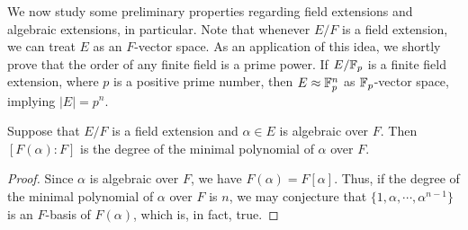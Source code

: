 We now study some preliminary properties regarding field extensions and algebraic extensions, in particular.
Note that whenever $E/F$ is a field extension, we can treat $E$ as an $F$-vector space.
As an application of this idea, we shortly prove that the order of any finite field is a prime power.
If $E/{\mathbb{F}}_p$ is a finite field extension, where $p$ is a positive prime number, then $E\approx {\mathbb{F}}_p^n$ as ${\mathbb{F}}_p$-vector space, implying $|E|=p^n$.

\begin{prop}
    Suppose that $E/F$ is a field extension and $\alpha\in E$ is algebraic over $F$.
    Then $[F(\alpha): F]$ is the degree of the minimal polynomial of $\alpha$ over $F$.
\end{prop}
\begin{proof}
    Since $\alpha$ is algebraic over $F$, we have $F(\alpha)=F[\alpha]$.
    Thus, if the degree of the minimal polynomial of $\alpha$ over $F$ is $n$, we may conjecture that $\{1, \alpha, \cdots, \alpha^{n-1}\}$ is an $F$-basis of $F(\alpha)$, \color{brown}which is, in fact, true\color{black}.
\end{proof}


